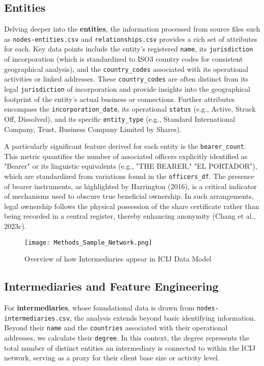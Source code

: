 \subsection{Entities}

Delving deeper into the \textbf{entities}, the information processed from source files such as \texttt{nodes-entities.csv} and \texttt{relationships.csv} provides a rich set of attributes for each. Key data points include the entity's registered \texttt{name}, its \texttt{jurisdiction} of incorporation (which is standardized to ISO3 country codes for consistent geographical analysis), and the \texttt{country\_codes} associated with its operational activities or linked addresses. These \texttt{country\_codes} are often distinct from its legal \texttt{jurisdiction} of incorporation and provide insights into the geographical footprint of the entity's actual business or connections. Further attributes encompass the \texttt{incorporation\_date}, its operational \texttt{status} (e.g., Active, Struck Off, Dissolved), and its specific \texttt{entity\_type} (e.g., Standard International Company, Trust, Business Company Limited by Shares).

A particularly significant feature derived for each entity is the \texttt{bearer\_count}. This metric quantifies the number of associated officers explicitly identified as "Bearer" or its linguistic equivalents (e.g., "THE BEARER," "EL PORTADOR"), which are standardized from variations found in the \texttt{officers\_df}. The presence of bearer instruments, as highlighted by Harrington (2016), is a critical indicator of mechanisms used to obscure true beneficial ownership. In such arrangements, legal ownership follows the physical possession of the share certificate rather than being recorded in a central register, thereby enhancing anonymity (Chang et al., 2023c).

\begin{figure}[htbp]
    \centering
    \texttt{[image: Methods\_Sample\_Network.png]}
    \caption{Overview of how Intermediaries appear in ICIJ Data Model}
    \label{fig:sample_network}
\end{figure}


\subsection{Intermediaries and Feature Engineering}

For \textbf{intermediaries}, whose foundational data is drawn from \texttt{nodes-intermediaries.csv}, the analysis extends beyond basic identifying information. Beyond their \texttt{name} and the \texttt{countries} associated with their operational addresses, we calculate their \texttt{degree}. In this context, the degree represents the total number of distinct entities an intermediary is connected to within the ICIJ network, serving as a proxy for their client base size or activity level.

